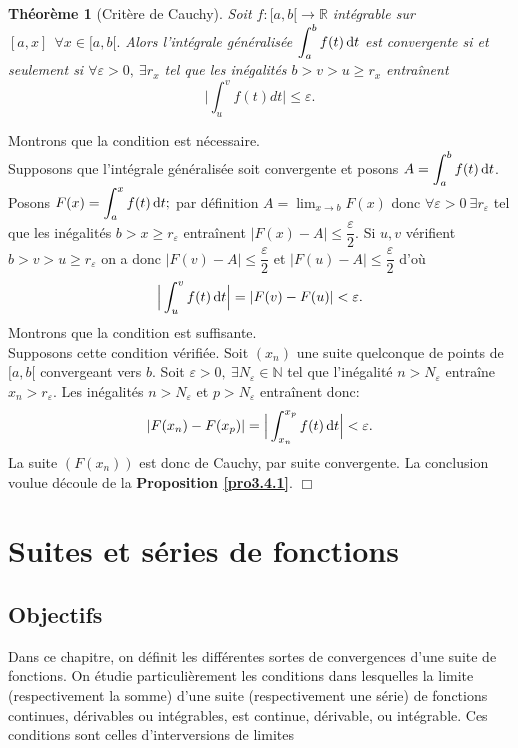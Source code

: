 \documentclass[11pt, a4paper]{book}
\newtheorem{teo}{Th\'eor\`eme}[section]
\newenvironment{pr}{\noindent {\bf Preuve} \noindent} {\hfill $\Box$\vskip 5mm}
\begin{document}
\begin{teo}[Crit\`ere de Cauchy]  \label{teo3.4.1}
Soit $f:[a,b[\longrightarrow \mathbb{R}$ int\'egrable sur $[a,x]~~\forall x\in [a,b[.$ Alors l'int\'egrale g\'en\'eralis\'ee ${\displaystyle \int_a^b f(t)\,\mathrm{d} t}$ est convergente si et seulement si $\forall \varepsilon >0,~\exists r_x$ tel que les in\'egalit\'es $b>v>u\geq r_x$ entra\^inent $$ \Big|\int_u^v f(t)dt\Big|\leq \varepsilon.$$
\end{teo}
\begin{pr}\quad
Montrons que la condition est n\'ecessaire.\\

Supposons que l'int\'egrale g\'en\'eralis\'ee soit convergente et posons ${\displaystyle A=\int_a^b f(t)\,\mathrm{d} t}$. Posons ${\displaystyle F(x)=\int_a^x f(t)\,\mathrm{d} t};$ par d\'efinition ${\displaystyle A= \lim_{x\rightarrow b} F(x)}$ donc $\forall \varepsilon >0~\exists r_\varepsilon$ tel que les in\'egalit\'es $b>x\geq r_\varepsilon$ entra\^inent $|F(x)-A|\leq \dfrac{\varepsilon}{2}.$ Si $u,v$ v\'erifient $b>v>u\geq r_\varepsilon$ on a donc $|F(v)-A|\leq \dfrac{\varepsilon}{2}$ et $|F(u)-A|\leq \dfrac{\varepsilon}{2}$ d'o\`u $$\Big| \int_u^v f(t)\,\mathrm{d} t\Big|=|F(v)-F(u)|<\varepsilon.$$
Montrons que la condition est suffisante.\\

 Supposons cette condition v\'erifi\'ee. Soit $(x_n)$ une suite quelconque de points de $[a,b[$ convergeant vers $b$. Soit $\varepsilon>0,~\exists N_\varepsilon \in \mathbb{N}$ tel que l'in\'egalit\'e $n>N_\varepsilon$ entra\^ine $x_n>r_\varepsilon.$ Les in\'egalit\'es $n>N_\varepsilon$ et $p>N_\varepsilon$ entra\^inent donc: $$|F(x_n)-F(x_p)|=\Big|\int_{x_n}^{x_p} f(t)\,\mathrm{d} t\Big|<\varepsilon.$$ La suite $(F(x_n))$ est donc de Cauchy, par suite convergente. La conclusion voulue d\'ecoule de la \textbf{Proposition \ref{pro3.4.1}}. 
\end{pr}


\chapter{Suites et s\'eries de fonctions}
\section{Objectifs}
Dans ce chapitre, on d\'efinit les diff\'erentes sortes de convergences d'une suite de fonctions. On \'etudie particuli\`erement les conditions dans lesquelles la limite (respectivement la somme) d'une suite (respectivement une s\'erie) de fonctions continues, d\'erivables ou int\'egrables, est continue, d\'erivable, ou int\'egrable. Ces conditions sont celles d'interversions de limites
\end{document}
